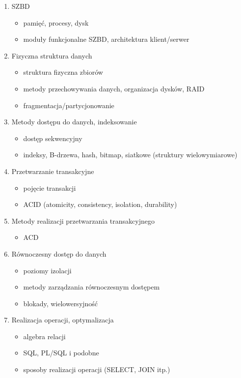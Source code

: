 \documentclass[12pt]{article}
\begin{document}
\begin{enumerate}
\item \ac{SZBD}
\begin{itemize}
\item pamięć, procesy, dysk
\item moduły funkcjonalne \ac{SZBD}, architektura klient/serwer
\end{itemize}
\item Fizyczna struktura danych
\begin{itemize}
\item struktura fizyczna zbiorów
\item metody przechowywania danych, organizacja dysków, \acs{RAID}
\item fragmentacja/partycjonowanie
\end{itemize}
\item Metody dostępu do danych, indeksowanie
\begin{itemize}
\item dostęp sekwencyjny
\item indeksy, B-drzewa, hash, bitmap, siatkowe (struktury wielowymiarowe)
\end{itemize}
\item Przetwarzanie transakcyjne
\begin{itemize}
\item pojęcie transakcji
\item ACID (atomicity, consistency, isolation, durability)
\end{itemize}
\item Metody realizacji przetwarzania transakcyjnego
\begin{itemize}
\item ACD
\end{itemize}
\item Równoczesny dostęp do danych
\begin{itemize}
\item poziomy izolacji
\item metody zarządzania równoczesnym dostępem
\item blokady, wielowersyjność
\end{itemize}
\item Realizacja operacji, optymalizacja
\begin{itemize}
\item algebra relacji
\item SQL, PL/SQL i podobne
\item sposoby realizacji operacji (SELECT, JOIN itp.)
\end{itemize}

\end{enumerate}
\end{document}
